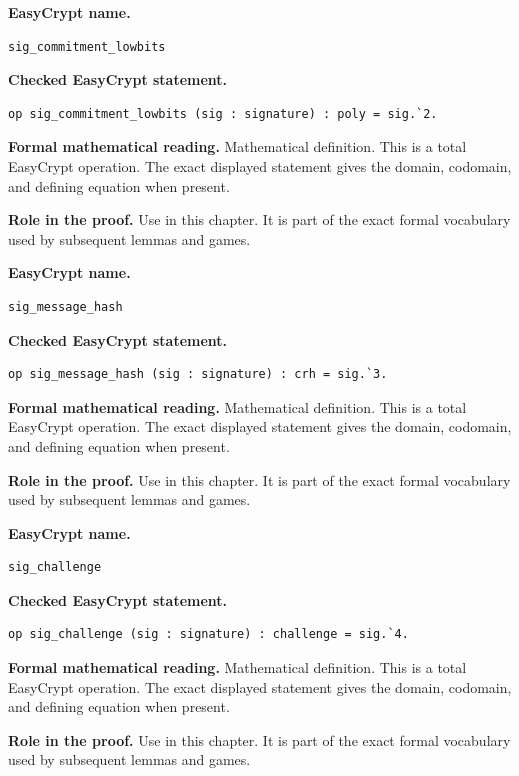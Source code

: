 \begin{formaldefinition}
\noindent\textbf{EasyCrypt name.}
\begin{lstlisting}[language=EasyCrypt,basicstyle=\ttfamily\scriptsize]
sig_commitment_lowbits
\end{lstlisting}
\noindent\textbf{Checked EasyCrypt statement.}
\begin{lstlisting}[language=EasyCrypt,basicstyle=\ttfamily\scriptsize]
op sig_commitment_lowbits (sig : signature) : poly = sig.`2.
\end{lstlisting}
\noindent\textbf{Formal mathematical reading.}
Mathematical definition. This is a total EasyCrypt operation.  The exact displayed statement gives the domain, codomain, and defining equation when present.

\noindent\textbf{Role in the proof.}
Use in this chapter. It is part of the exact formal vocabulary used by subsequent lemmas and games.

\end{formaldefinition}

\begin{formaldefinition}
\noindent\textbf{EasyCrypt name.}
\begin{lstlisting}[language=EasyCrypt,basicstyle=\ttfamily\scriptsize]
sig_message_hash
\end{lstlisting}
\noindent\textbf{Checked EasyCrypt statement.}
\begin{lstlisting}[language=EasyCrypt,basicstyle=\ttfamily\scriptsize]
op sig_message_hash (sig : signature) : crh = sig.`3.
\end{lstlisting}
\noindent\textbf{Formal mathematical reading.}
Mathematical definition. This is a total EasyCrypt operation.  The exact displayed statement gives the domain, codomain, and defining equation when present.

\noindent\textbf{Role in the proof.}
Use in this chapter. It is part of the exact formal vocabulary used by subsequent lemmas and games.

\end{formaldefinition}

\begin{formaldefinition}
\noindent\textbf{EasyCrypt name.}
\begin{lstlisting}[language=EasyCrypt,basicstyle=\ttfamily\scriptsize]
sig_challenge
\end{lstlisting}
\noindent\textbf{Checked EasyCrypt statement.}
\begin{lstlisting}[language=EasyCrypt,basicstyle=\ttfamily\scriptsize]
op sig_challenge (sig : signature) : challenge = sig.`4.
\end{lstlisting}
\noindent\textbf{Formal mathematical reading.}
Mathematical definition. This is a total EasyCrypt operation.  The exact displayed statement gives the domain, codomain, and defining equation when present.

\noindent\textbf{Role in the proof.}
Use in this chapter. It is part of the exact formal vocabulary used by subsequent lemmas and games.

\end{formaldefinition}

